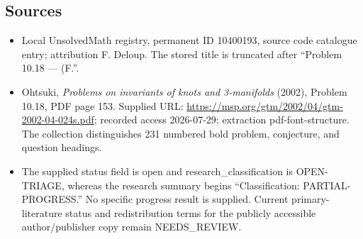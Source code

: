 \documentclass[11pt]{article}
\begin{document}
\subsection{Sources}
\begin{itemize}
\item Local UnsolvedMath registry, permanent ID 10400193, source code catalogue entry; attribution F. Deloup. The stored title is truncated after ``Problem 10.18 --- (F.''.
\item Ohtsuki, \emph{Problems on invariants of knots and 3-manifolds} (2002), Problem 10.18, PDF page 153. Supplied URL: \url{https://msp.org/gtm/2002/04/gtm-2002-04-024s.pdf}; recorded access 2026-07-29; extraction pdf-font-structure. The collection distinguishes 231 numbered bold problem, conjecture, and question headings.
\item The supplied status field is open and research\_classification is OPEN-TRIAGE, whereas the research summary begins ``Classification: PARTIAL-PROGRESS.'' No specific progress result is supplied. Current primary-literature status and redistribution terms for the publicly accessible author/publisher copy remain NEEDS\_REVIEW.
\end{itemize}
\end{document}
